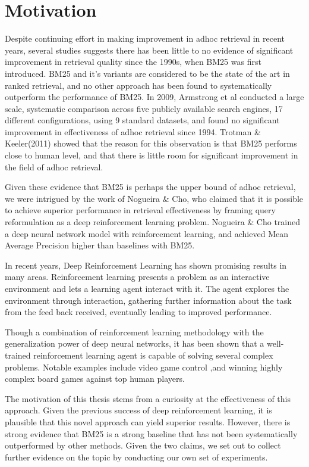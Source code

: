 \section{Motivation}

Despite continuing effort in making improvement in adhoc retrieval in recent years, several studies suggests there has been little to no evidence of significant improvement in retrieval quality since the 1990s, when BM25 was first introduced. BM25 and it's variants are considered to be the state of the art in ranked retrieval, and no other approach has been found to systematically outperform the performance of BM25\cite{trotman2014improvements}. In 2009, Armstrong et al\cite{armstrong2009improvements} conducted a large scale, systematic comparison across five publicly available search engines, 17 different configurations, using 9 standard datasets, and found no significant improvement in effectiveness of adhoc retrieval since 1994. Trotman \& Keeler(2011) showed that the reason for this observation is that BM25 performs close to human level, and that there is little room for significant improvement in the field of adhoc retrieval.

Given these evidence that BM25 is perhaps the upper bound of adhoc retrieval, we were intrigued by the work of Nogueira \& Cho\cite{nogueira2017task}, who claimed that it is possible to achieve superior performance in retrieval effectiveness by framing query reformulation as a deep reinforcement learning problem. Nogueira \& Cho trained a deep neural network model with reinforcement learning, and achieved Mean Average Precision higher than baselines with BM25.

In recent years, Deep Reinforcement Learning has shown promising results in many areas. Reinforcement learning presents a problem as an interactive environment and lets a learning agent interact with it.  The agent explores the environment through interaction, gathering further information about the task from the feed back received, eventually leading to improved performance. 

Though a combination of reinforcement learning methodology with the generalization power of deep neural networks, it has been shown that a well-trained reinforcement learning agent is capable of solving several complex problems.  Notable examples include video game control \cite{mnih2013playing} ,and winning highly complex board games against top human players\cite{silver2016mastering}.

The motivation of this thesis stems from a curiosity at the effectiveness of this approach. Given the previous success of deep reinforcement learning, it is plausible that this novel approach can yield superior results. However, there is strong evidence that BM25 is a strong baseline that has not been systematically outperformed by other methods. Given the two claims, we set out to collect further evidence on the topic by conducting our own set of experiments. 

